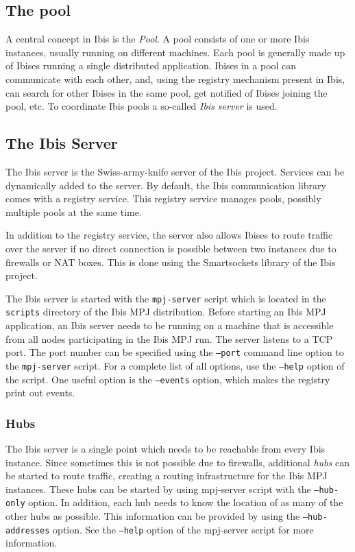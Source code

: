 \documentclass[a4paper,10pt]{article}
\begin{document}
\subsection{The pool}

A central concept in Ibis is the \emph{Pool}. A pool consists of one or
more Ibis instances, usually running on different machines. Each pool is
generally made up of Ibises running a single distributed application.
Ibises in a pool can communicate with each other, and, using the
registry mechanism present in Ibis, can search for other Ibises in the
same pool, get notified of Ibises joining the pool, etc. To
coordinate Ibis pools a so-called \emph{Ibis server} is used.

\subsection{The Ibis Server}

The Ibis server is the Swiss-army-knife server of the Ibis project.
Services can be dynamically added to the server. By default, the Ibis
communication library comes with a registry service. This registry
service manages pools, possibly multiple pools at the same time.

In addition to the registry service, the server also allows
Ibises to route traffic over the server if no direct connection is
possible between two instances due to firewalls or NAT boxes. This is
done using the Smartsockets library of the Ibis project.

The Ibis server is started with the \texttt{mpj-server} script which is
located in the \texttt{scripts} directory of the Ibis MPJ distribution.  Before
starting an Ibis MPJ application, an Ibis server needs to be running on a
machine that is accessible from all nodes participating in the Ibis MPJ run.
The server listens to a TCP port. The port number can be specified using
the \texttt{--port} command line option to the \texttt{mpj-server}
script.  For a complete list of all options, use the \texttt{--help}
option of the script. One useful option is the  \texttt{--events}
option, which makes the registry print out events.

\subsubsection{Hubs}
\label{hubs}

The Ibis server is a single point which needs to be reachable from every
Ibis instance. Since sometimes this is not possible due to firewalls,
additional \emph{hubs} can be started to route traffic, creating a
routing infrastructure for the Ibis MPJ instances. These hubs can be started
by using mpj-server script with the \texttt{--hub-only} option. In
addition, each hub needs to know the location of as many of the other
hubs as possible. This information can be provided by using the
\texttt{--hub-addresses} option. See the \texttt{--help} option of the
mpj-server script for more information.
\end{document}
